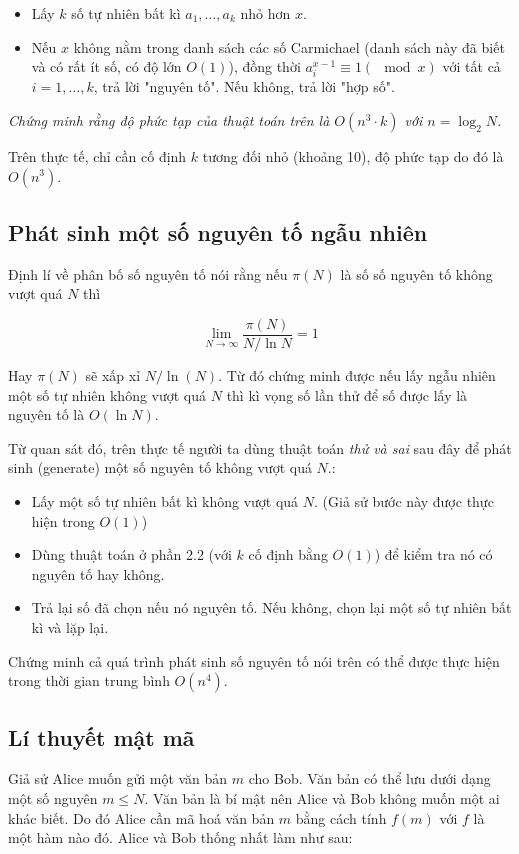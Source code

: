 \documentclass{article}
\begin{document}
\begin{itemize}
    \item Lấy $k$ số tự nhiên bất kì $a_1, \ldots, a_k$ nhỏ hơn $x$.
    \item Nếu $x$ không nằm trong danh sách các số Carmichael (danh sách này đã biết và có rất ít số, có độ lớn $O(1)$), đồng thời $a_i^{x-1} \equiv 1 (\mod x)$ với tất cả $i = 1, \ldots, k$, trả lời "nguyên tố". Nếu không, trả lời "hợp số".
\end{itemize}

\textit{Chứng minh rằng độ phức tạp của thuật toán trên là $O(n^3\cdot k)$ với $n = \log_2 N$. }

Trên thực tế, chỉ cần cố định $k$ tương đối nhỏ (khoảng 10), độ phức tạp do đó là $O(n^3)$.

\subsection{Phát sinh một số nguyên tố ngẫu nhiên}
Định lí về phân bố số nguyên tố nói rằng nếu $\pi(N)$ là số số nguyên tố không vượt quá $N$ thì

$$
\lim\limits_{N\to \infty} \frac{\pi(N)}{N/\ln N} = 1 
$$

Hay $\pi(N)$ sẽ xấp xỉ $N/\ln(N)$. Từ đó chứng minh được nếu lấy ngẫu nhiên một số tự nhiên không vượt quá $N$ thì kì vọng số lần thử để số được lấy là nguyên tố là $O(\ln N)$.

Từ quan sát đó, trên thực tế người ta dùng thuật toán \textit{thử và sai} sau đây để phát sinh (generate) một số nguyên tố không vượt quá $N$.:

\begin{itemize}
    \item Lấy một số tự nhiên bất kì không vượt quá $N$. (Giả sử bước này được thực hiện trong $O(1)$)
    \item Dùng thuật toán ở phần 2.2 (với $k$ cố định bằng $O(1)$) để kiểm tra nó có nguyên tố hay không. 
    \item Trả lại số đã chọn nếu nó nguyên tố. Nếu không, chọn lại một số tự nhiên bất kì và lặp lại.
\end{itemize}

\begin{em}
    Chứng minh cả quá trình phát sinh số nguyên tố nói trên có thể được thực hiện trong thời gian trung bình $O(n^4)$.
\end{em}

\subsection{Lí thuyết mật mã}
Giả sử Alice muốn gửi một văn bản $m$ cho Bob. Văn bản có thể lưu dưới dạng một số nguyên $m \leq N$. Văn bản là bí mật nên Alice và Bob không muốn một ai khác biết. Do đó Alice cần mã hoá văn bản $m$ bằng cách tính $f(m)$ với $f$ là một hàm nào đó. Alice và Bob thống nhất làm như sau:
\end{document}
